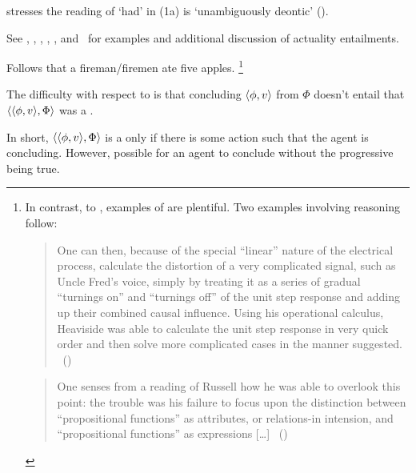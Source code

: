 \begin{note}
{    \citeauthor{Alxatib:2019wf} stresses the reading of `had' in (1a) is `unambiguously deontic' (\citeyear[703]{Alxatib:2019wf}).

    See \textcite{Asher:2012vr}, \textcite{Bhatt:2008aa}, \textcite{Hacquard:2006to,Hacquard:2009ta}, \textcite{Palmer:1977wb}, \textcite{Pinon:2003te}, and~\textcite{Werner:2011tp} for examples and additional discussion of actuality entailments.
  }
  Follows that a fireman/firemen ate five apples.%
  \footnote{
    In contrast, to \BoyPS{}, examples of \BoyPSC{} are plentiful.
    Two examples involving reasoning follow:

    \begin{quote}
      One can then, because of the special ``linear'' nature of the electrical process, calculate the distortion of a very complicated signal, such as Uncle Fred's voice, simply by treating it as a series of gradual ``turnings on'' and ``turnings off'' of the unit step response and adding up their combined causal influence.
      Using his operational calculus, Heaviside was able to calculate the unit step response in very quick order and then solve more complicated cases in the manner suggested.%
      \mbox{ }\hfill\mbox{(\cite[316]{Wilson:1988wx})}
    \end{quote}

     \begin{quote}
       One senses from a reading of Russell how he was able to overlook this point:
       the trouble was his failure to focus upon the distinction between ``propositional functions'' as attributes, or relations-in intension, and ``propositional functions'' as expressions [\dots]%
      \mbox{ }\hfill\mbox{(\cite[152]{Quine:1967tv})}
    \end{quote}

  }



  The difficulty with respect to  is that concluding \(\langle \phi, v \rangle\) from \(\Phi\) doesn't entail that \(\langle \langle \phi, v \rangle, \Phi \rangle\) was a \fc{}.

  In short, \(\langle \langle \phi, v \rangle, \Phi \rangle\) is a \fc{} only if there is some action such that the agent is concluding.
  However, possible for an agent to conclude without the progressive being true.


\end{note}
